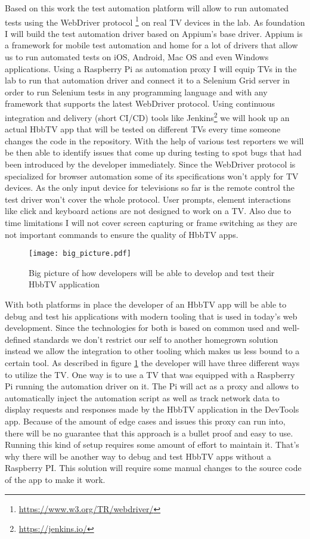 Based on this work the test automation platform will allow to run automated tests using the WebDriver
protocol \footnote{\url{https://www.w3.org/TR/webdriver/}} on real TV devices in the lab. As foundation I will build the
test automation driver based on Appium's base driver. Appium is a framework for mobile test automation and home
for a lot of drivers that allow us to run automated tests on iOS, Android, Mac OS and even Windows applications.
Using a Raspberry Pi as automation proxy I will equip TVs in the lab to run that automation driver and connect
it to a Selenium Grid server in order to run Selenium tests in any programming language and with any framework
that supports the latest WebDriver protocol. Using continuous integration and delivery (short CI/CD) tools like
Jenkins\footnote{\url{https://jenkins.io/}} we will hook up an actual HbbTV app that will be tested on different
TVs every time someone changes the code in the repository. With the help of various test reporters we will be then
able to identify issues that come up during testing to spot bugs that had been introduced by the developer
immediately. Since the WebDriver protocol is specialized for browser automation some of its specifications won't
apply for TV devices. As the only input device for televisions so far is the remote control the test driver won't
cover the whole protocol. User prompts, element interactions like click and keyboard actions are not designed
to work on a TV. Also due to time limitations I will not cover screen capturing or frame switching as they are
not important commands to ensure the quality of HbbTV apps.

\begin{figure}[htb]
  \centering
  \texttt{[image: big\_picture.pdf]}
  \caption{Big picture of how developers will be able to develop and test their HbbTV application}\label{fig:bigpicture}
\end{figure}

With both platforms in place the developer of an HbbTV app will be able to debug and test his applications
with modern tooling that is used in today's web development. Since the technologies for both is based on
common used and well-defined standards we don't restrict our self to another homegrown solution instead we
allow the integration to other tooling which makes us less bound to a certain tool. As described in figure
\ref{fig:bigpicture} the developer will have three different ways to utilize the TV. One way is to use
a TV that was equipped with a Raspberry Pi running the automation driver on it. The Pi will act as a proxy
and allows to automatically inject the automation script as well as track network data to display requests
and responses made by the HbbTV application in the DevTools app. Because of the amount of edge cases and
issues this proxy can run into, there will be no guarantee that this approach is a bullet proof and easy to
use. Running this kind of setup requires some amount of effort to maintain it. That's why there
will be another way to debug and test HbbTV apps without a Raspberry PI. This solution will require some
manual changes to the source code of the app to make it work.

